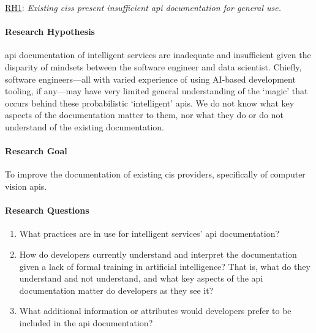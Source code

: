 \begin{titled-frame}{\underline{RH1}: \textit{Existing \glspl{cis} present insufficient \gls{api} documentation for general use.} }
\vspace{-12pt}
\paragraph{Research Hypothesis}
\gls{api} documentation of intelligent services are inadequate and insufficient given the disparity of mindsets between the software engineer and data scientist. Chiefly, software engineers---all with varied experience of using AI-based development tooling, if any---may have very limited general understanding of the `magic' that occurs behind these probabilistic `intelligent' \glspl{api}. We do not know what key aspects of the documentation matter to them, nor what they do or do not understand of the existing documentation.

\paragraph{Research Goal}
To improve the documentation of existing \gls{cis} providers, specifically of computer vision \glspl{api}.

\paragraph{Research Questions}
\begin{enumerate}[label=\textbf{RQ1.\arabic*.}, ref=RQ1.\arabic*, leftmargin=3.5\parindent, rightmargin=1\parindent]
  \item What practices are in use for intelligent services' \gls{api} documentation? 
  \label{rqs:apidoc:what-is-in-use}
  
  \item How do developers currently understand and interpret the documentation given a lack of formal training in artificial intelligence? That is, what do they understand and not understand, and what key aspects of the \gls{api} documentation matter do developers as they see it?
  \label{rqs:apidoc:how-do-devs-understand-it}
  
  \item What additional information or attributes would developers prefer to be included in the \gls{api} documentation?
  \label{rqs:apidoc:what-additional-information-needed}
\end{enumerate}


\end{titled-frame}
